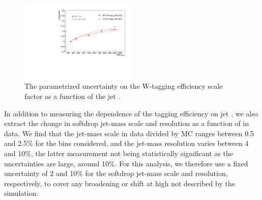  \begin{figure}[h!]
 \centering
 \includegraphics[width=0.49\textwidth]{figures/vtagging/2017_sf/ptdep.pdf}
 \caption{The parametrized uncertainty on the W-tagging efficiency scale factor as a function of the jet \PT.}
 \label{fig:searchIII:tau21ptdep}
 \end{figure}
In addition to measuring the dependence of the tagging efficiency on jet \PT, we  also extract the change in softdrop jet-mass scale and resolution as a function of \PT in data. We find that the jet-mass scale in data divided by MC ranges between 0.5 and 2.5\% for the \PT bins considered, and the jet-mass resolution varies between 4 and 10\%, the latter measurement not being statistically significant as the uncertainties are large, around 10\%. For this analysis, we therefore use a fixed uncertainty of 2 and 10\% for the softdrop jet-mass scale and resolution, respectively, to cover any broadening or shift at high \PT not described by the simulation.
   
\clearpage    

